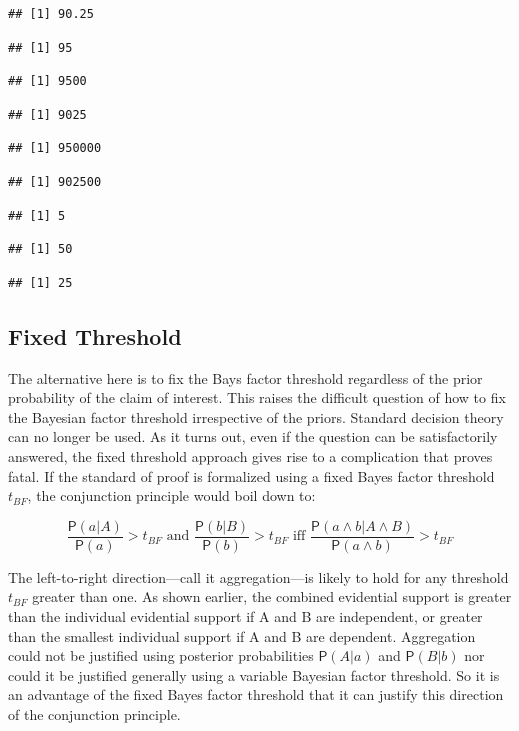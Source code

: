 \documentclass[10pt,dvipsnames,enabledeprecatedfontcommands]{scrartcl}
\newcommand{\et}{\wedge}
\newcommand{\pr}[1]{\mathsf{P}(#1)}
\begin{document}
\begin{verbatim}
## [1] 90.25
\end{verbatim}

\begin{verbatim}
## [1] 95
\end{verbatim}

\begin{verbatim}
## [1] 9500
\end{verbatim}

\begin{verbatim}
## [1] 9025
\end{verbatim}

\begin{verbatim}
## [1] 950000
\end{verbatim}

\begin{verbatim}
## [1] 902500
\end{verbatim}

\begin{verbatim}
## [1] 5
\end{verbatim}

\begin{verbatim}
## [1] 50
\end{verbatim}

\begin{verbatim}
## [1] 25
\end{verbatim}

\hypertarget{fixed-threshold}{%
\subsection{Fixed Threshold}\label{fixed-threshold}}

The alternative here is to fix the Bays factor threshold regardless of
the prior probability of the claim of interest. This raises the
difficult question of how to fix the Bayesian factor threshold
irrespective of the priors. Standard decision theory can no longer be
used. As it turns out, even if the question can be satisfactorily
answered, the fixed threshold approach gives rise to a complication that
proves fatal. If the standard of proof is formalized using a fixed Bayes
factor threshold \(t_{BF}\), the conjunction principle would boil down
to:

\[  \text{ $\frac{\pr{a | A }}{\pr{a}}>t_{BF}$ and $\frac{\pr{ b | B}}{\pr{b}}>t_{BF}$ iff $\frac{\pr{a \et b | A \et B}}{\pr{a \et b}}>t_{BF}$ } \]

\noindent The left-to-right direction---call it aggregation---is likely
to hold for any threshold \(t_{BF}\) greater than one. As shown earlier,
the combined evidential support is greater than the individual
evidential support if A and B are independent, or greater than the
smallest individual support if A and B are dependent. Aggregation could
not be justified using posterior probabilities \(\pr{A | a}\) and
\(\pr{B | b}\) nor could it be justified generally using a variable
Bayesian factor threshold. So it is an advantage of the fixed Bayes
factor threshold that it can justify this direction of the conjunction
principle.
\end{document}
